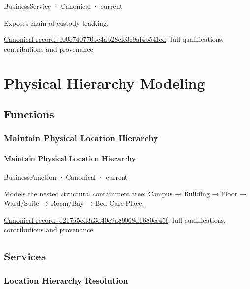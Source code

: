 \label{element:100e740770bc4ab28cfe3c9af4b541cd}
{\small BusinessService · Canonical · current}\par

Exposes chain-of-custody tracking.


{\footnotesize \href{../../../../continuum/business/business-service/100e740770bc4ab28cfe3c9af4b541cd.md}{Canonical record: 100e740770bc4ab28cfe3c9af4b541cd}; full qualifications, contributions and provenance.}\par
\section{Physical Hierarchy Modeling}

\subsection{Functions}

\subsubsection{Maintain Physical Location Hierarchy}

\paragraph{Maintain Physical Location Hierarchy}

\label{element:d217a5cd3a3d40e9a89068d1680ec45f}
{\small BusinessFunction · Canonical · current}\par

Models the nested structural containment tree: Campus → Building → Floor → Ward/Suite → Room/Bay → Bed Care-Place.


{\footnotesize \href{../../../../continuum/business/business-function/d217a5cd3a3d40e9a89068d1680ec45f.md}{Canonical record: d217a5cd3a3d40e9a89068d1680ec45f}; full qualifications, contributions and provenance.}\par
\subsection{Services}

\subsubsection{Location Hierarchy Resolution}

